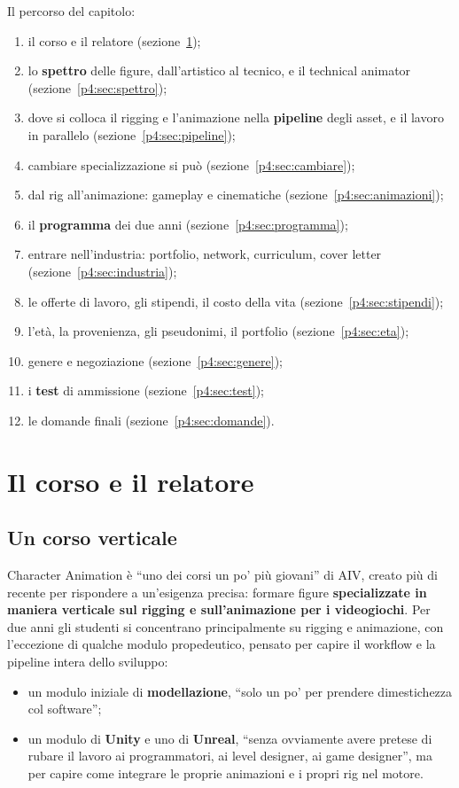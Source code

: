 Il percorso del capitolo:
\begin{enumerate}
  \item il corso e il relatore (sezione~\ref{p4:sec:corso});
  \item lo \textbf{spettro} delle figure, dall'artistico al tecnico, e il
        technical animator (sezione~\ref{p4:sec:spettro});
  \item dove si colloca il rigging e l'animazione nella \textbf{pipeline}
        degli asset, e il lavoro in parallelo
        (sezione~\ref{p4:sec:pipeline});
  \item cambiare specializzazione si può (sezione~\ref{p4:sec:cambiare});
  \item dal rig all'animazione: gameplay e cinematiche
        (sezione~\ref{p4:sec:animazioni});
  \item il \textbf{programma} dei due anni (sezione~\ref{p4:sec:programma});
  \item entrare nell'industria: portfolio, network, curriculum, cover
        letter (sezione~\ref{p4:sec:industria});
  \item le offerte di lavoro, gli stipendi, il costo della vita
        (sezione~\ref{p4:sec:stipendi});
  \item l'età, la provenienza, gli pseudonimi, il portfolio
        (sezione~\ref{p4:sec:eta});
  \item genere e negoziazione (sezione~\ref{p4:sec:genere});
  \item i \textbf{test} di ammissione (sezione~\ref{p4:sec:test});
  \item le domande finali (sezione~\ref{p4:sec:domande}).
\end{enumerate}

\section{Il corso e il relatore}
\label{p4:sec:corso}

\subsection{Un corso verticale}

Character Animation è ``uno dei corsi un po' più giovani'' di AIV, creato più
di recente per rispondere a un'esigenza precisa: formare figure
\textbf{specializzate in maniera verticale sul rigging e sull'animazione per
i videogiochi}. Per due anni gli studenti si concentrano principalmente su
rigging e animazione, con l'eccezione di qualche modulo propedeutico, pensato
per capire il workflow e la pipeline intera dello sviluppo:
\begin{itemize}
  \item un modulo iniziale di \textbf{modellazione}, ``solo un po' per
        prendere dimestichezza col software'';
  \item un modulo di \textbf{Unity} e uno di \textbf{Unreal}, ``senza
        ovviamente avere pretese di rubare il lavoro ai programmatori, ai
        level designer, ai game designer'', ma per capire come integrare le
        proprie animazioni e i propri rig nel motore.
\end{itemize}

